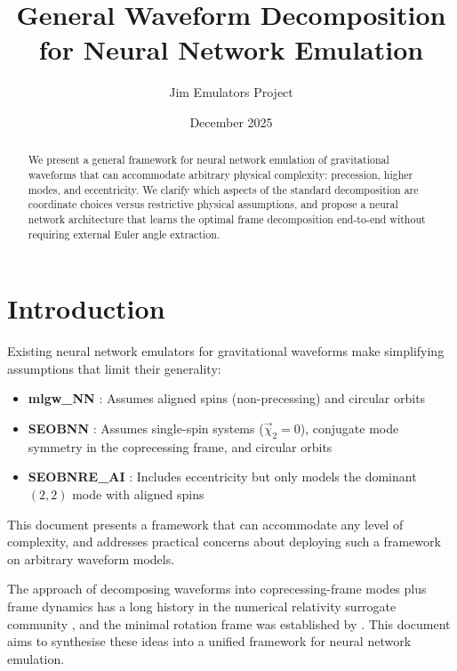 \documentclass[11pt,a4paper]{article}
\title{General Waveform Decomposition for Neural Network Emulation}
\author{Jim Emulators Project}
\date{December 2025}
\newcommand{\vecchi}{\vec{\chi}}
\begin{document}
\maketitle

\begin{abstract}
We present a general framework for neural network emulation of gravitational waveforms that can accommodate arbitrary physical complexity: precession, higher modes, and eccentricity. We clarify which aspects of the standard decomposition are coordinate choices versus restrictive physical assumptions, and propose a neural network architecture that learns the optimal frame decomposition end-to-end without requiring external Euler angle extraction.
\end{abstract}

\tableofcontents
\newpage

\section{Introduction}

Existing neural network emulators for gravitational waveforms make simplifying assumptions that limit their generality:
\begin{itemize}
    \item \textbf{mlgw\_NN} \cite{mlgw_nn}: Assumes aligned spins (non-precessing) and circular orbits
    \item \textbf{SEOBNN} \cite{seobnn}: Assumes single-spin systems ($\vecchi_2 = 0$), conjugate mode symmetry in the coprecessing frame, and circular orbits
    \item \textbf{SEOBNRE\_AI} \cite{seobnre_ai}: Includes eccentricity but only models the dominant $(2,2)$ mode with aligned spins
\end{itemize}

This document presents a framework that can accommodate any level of complexity, and addresses practical concerns about deploying such a framework on arbitrary waveform models.

The approach of decomposing waveforms into coprecessing-frame modes plus frame dynamics has a long history in the numerical relativity surrogate community \cite{blackman2015,blackman2017,varma2019,boyle2011}, and the minimal rotation frame was established by \cite{boyle2011,schmidt2011}. This document aims to synthesise these ideas into a unified framework for neural network emulation.
\end{document}
